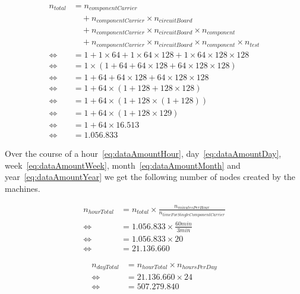 \begin{equation}
  \label{eq:dataAmount}
  \begin{aligned}
    n_{total} &= n_{componentCarrier} \\
    &\quad + n_{componentCarrier} \times n_{circuitBoard} \\
    &\quad + n_{componentCarrier} \times n_{circuitBoard} \times n_{component} \\
    &\quad + n_{componentCarrier} \times n_{circuitBoard} \times n_{component} \times n_{test} \\
    \iff &= 1 + 1 \times 64 + 1 \times 64 \times 128 + 1 \times 64 \times 128 \times 128 \\
    \iff &= 1 \times (1 + 64 + 64 \times 128 + 64 \times 128 \times 128) \\
    \iff &= 1 + 64 + 64 \times 128 + 64 \times 128 \times 128 \\
    \iff &= 1 + 64 \times (1 + 128 + 128 \times 128) \\
    \iff &= 1 + 64 \times (1 + 128 \times (1 + 128)) \\
    \iff &= 1 + 64 \times (1 + 128 \times 129) \\
    \iff &= 1 + 64 \times 16.513 \\
    \iff &= 1.056.833
  \end{aligned}
\end{equation}


Over the course of a hour~\ref{eq:dataAmountHour}, day~\ref{eq:dataAmountDay}, week~\ref{eq:dataAmountWeek}, month~\ref{eq:dataAmountMonth} and year~\ref{eq:dataAmountYear} we get the following number of nodes created by the machines.

\begin{equation}
  \label{eq:dataAmountHour}
  \begin{aligned}
      n_{hourTotal} &= n_{total} \times \frac{n_{minutesPerHour}}{n_{timeForSingleComponentCarrier}} \\
      \iff &= 1.056.833 \times \frac{60min}{3min} \\
      \iff &= 1.056.833 \times 20 \\
      \iff &= 21.136.660
  \end{aligned}
\end{equation}

\begin{equation}
  \label{eq:dataAmountDay}
  \begin{aligned}
      n_{dayTotal} &= n_{hourTotal} \times n_{hoursPerDay}\\
      \iff &= 21.136.660 \times 24 \\
      \iff &= 507.279.840
  \end{aligned}
\end{equation}

